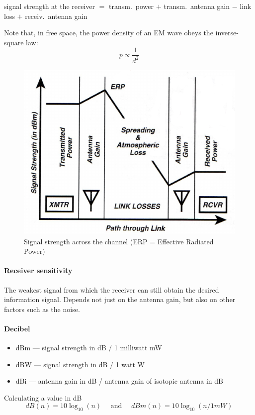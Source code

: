 signal strength at the receiver $=$ transm.\ power $+$ transm.\ antenna gain
$-$ link loss $+$ receiv.\ antenna gain

Note that, in free space, the power density of an EM wave obeys the
inverse-square law:
\[p \propto \frac{1}{d^2} \]

\begin{figure}[h]
	\centering
	\includegraphics[scale=0.4]{images/1-signal-strength.png}
	\caption{Signal strength across the channel (ERP = Effective Radiated Power)}%
	\label{fig:signal-strength}
\end{figure}

\paragraph{Receiver sensitivity}
The weakest signal from which the receiver can still obtain the desired
information signal. Depends not just on the antenna gain, but also on other
factors such as the noise.

\paragraph{Decibel}
\begin{itemize}
	\item dBm --- signal strength in dB / 1 milliwatt mW
	\item dBW --- signal strength in dB / 1 watt W
	\item dBi --- antenna gain in dB / antenna gain of isotopic antenna in dB
\end{itemize}
Calculating a value in dB \[ dB(n) = 10 \log_{10} (n) \quad \text{ and } \quad dBm(n) = 10 \log_{10} (n / 1 mW) \]

